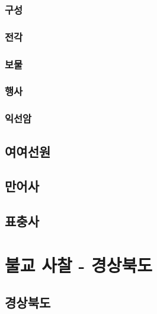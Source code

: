 \documentclass[12pt, a4paper, oneside]{book}
\let\stdsection\section
\renewcommand\section{\newpage\stdsection}
\begin{document}
		\section{구성}

		\section{전각}

		\section{보물}

		\section{행사}


		\section{익선암}


	\chapter{여여선원 }


	\chapter{만어사}


	\chapter{표충사}



	\part{불교 사찰 - 경상북도}
	\noptcrule
	\parttoc				


	\chapter{ 경상북도 }
\end{document}
